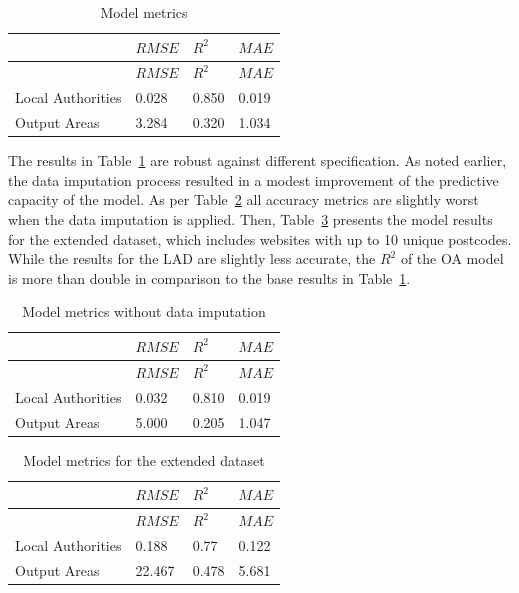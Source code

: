\documentclass[
  authoryear,
  preprint,
  3p]{elsarticle}
\begin{document}
\begin{longtable}[]{@{}llll@{}}
\caption{Model metrics}\label{tbl-model-metrics}\tabularnewline
\toprule\noalign{}
& \(RMSE\) & \(R^{2}\) & \(MAE\) \\
\midrule\noalign{}
\endfirsthead
\toprule\noalign{}
& \(RMSE\) & \(R^{2}\) & \(MAE\) \\
\midrule\noalign{}
\endhead
\bottomrule\noalign{}
\endlastfoot
Local Authorities & 0.028 & 0.850 & 0.019 \\
Output Areas & 3.284 & 0.320 & 1.034 \\
\end{longtable}

The results in Table~\ref{tbl-model-metrics} are robust against
different specification. As noted earlier, the data imputation process
resulted in a modest improvement of the predictive capacity of the
model. As per Table~\ref{tbl-model-metrics-no-correction} all accuracy
metrics are slightly worst when the data imputation is applied. Then,
Table~\ref{tbl-model-metrics-10} presents the model results for the
extended dataset, which includes websites with up to 10 unique
postcodes. While the results for the LAD are slightly less accurate, the
\(R^{2}\) of the OA model is more than double in comparison to the base
results in Table~\ref{tbl-model-metrics}.

\begin{longtable}[]{@{}llll@{}}
\caption{Model metrics without data
imputation}\label{tbl-model-metrics-no-correction}\tabularnewline
\toprule\noalign{}
& \(RMSE\) & \(R^{2}\) & \(MAE\) \\
\midrule\noalign{}
\endfirsthead
\toprule\noalign{}
& \(RMSE\) & \(R^{2}\) & \(MAE\) \\
\midrule\noalign{}
\endhead
\bottomrule\noalign{}
\endlastfoot
Local Authorities & 0.032 & 0.810 & 0.019 \\
Output Areas & 5.000 & 0.205 & 1.047 \\
\end{longtable}

\begin{longtable}[]{@{}llll@{}}
\caption{Model metrics for the extended
dataset}\label{tbl-model-metrics-10}\tabularnewline
\toprule\noalign{}
& \(RMSE\) & \(R^{2}\) & \(MAE\) \\
\midrule\noalign{}
\endfirsthead
\toprule\noalign{}
& \(RMSE\) & \(R^{2}\) & \(MAE\) \\
\midrule\noalign{}
\endhead
\bottomrule\noalign{}
\endlastfoot
Local Authorities & 0.188 & 0.77 & 0.122 \\
Output Areas & 22.467 & 0.478 & 5.681 \\
\end{longtable}
\end{document}
